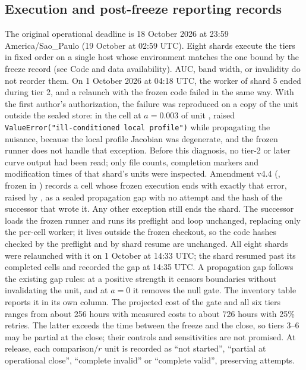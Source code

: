 \subsection*{Execution and post-freeze reporting records}\label{supp:execution-records}

The original operational deadline is 18 October 2026 at 23:59 America/Sao\_Paulo (19 October at 02:59 UTC). %
Eight shards execute the tiers in fixed order on a single host whose environment matches the one bound by the freeze record (see Code and data availability). AUC, band width, or invalidity do not reorder them. %
On 1 October 2026 at 04:18 UTC, the worker of shard 5 ended during tier 2, and a relaunch with the frozen code failed in the same way. With the first author's authorization, the failure was reproduced on a copy of the unit outside the sealed store: in the cell at $a=0.003$ of unit ,  raised \texttt{ValueError("ill-conditioned local profile")} while propagating the nuisance, because the local profile Jacobian was degenerate, and the frozen runner does not handle that exception. Before this diagnosis, no tier-2 or later curve output had been read; only file counts, completion markers and modification times of that shard's units were inspected. %
Amendment v4.4 (, frozen in ) records a cell whose frozen execution ends with exactly that error, raised by , as a sealed propagation gap with no attempt and the hash of the successor that wrote it. Any other exception still ends the shard. The successor loads the frozen runner and runs its preflight and loop unchanged, replacing only the per-cell worker; it lives outside the frozen checkout, so the code hashes checked by the preflight and by shard resume are unchanged. All eight shards were relaunched with it on 1 October at 14:33 UTC; the shard resumed past its completed cells and recorded the gap at 14:35 UTC. A propagation gap follows the existing gap rules: at a positive strength it censors boundaries without invalidating the unit, and at $a=0$ it removes the null gate. The inventory table reports it in its own column. %
The projected cost of the gate and all six tiers ranges from about 256 hours with measured costs to about 726 hours with 25\% retries. The latter exceeds the time between the freeze and the close, so tiers 3--6 may be partial at the close; their controls and sensitivities are not promised. %
At release, each comparison/$r$ unit is recorded as ``not started'', ``partial at operational close'', ``complete invalid'' or ``complete valid'', preserving attempts. %
